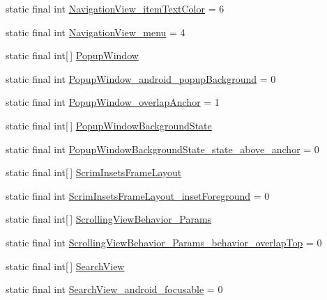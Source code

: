 \begin{DoxyCompactItemize}
\item 
static final int \hyperlink{classcheck_1_1test_1_1_r_1_1styleable_aee02dda2f676d8cbb891a1e27e386d49}{Navigation\+View\+\_\+item\+Text\+Color} = 6
\item 
static final int \hyperlink{classcheck_1_1test_1_1_r_1_1styleable_a96d0c1fc480a50b365523e0530106f73}{Navigation\+View\+\_\+menu} = 4
\item 
static final int\mbox{[}$\,$\mbox{]} \hyperlink{classcheck_1_1test_1_1_r_1_1styleable_a288d8e82cd6f78d38522b3bd6c8acc55}{Popup\+Window}
\item 
static final int \hyperlink{classcheck_1_1test_1_1_r_1_1styleable_ad1f620b82190cd4dec8ccbeb3d2904c7}{Popup\+Window\+\_\+android\+\_\+popup\+Background} = 0
\item 
static final int \hyperlink{classcheck_1_1test_1_1_r_1_1styleable_aeff228e6915165337ceeae75105f3722}{Popup\+Window\+\_\+overlap\+Anchor} = 1
\item 
static final int\mbox{[}$\,$\mbox{]} \hyperlink{classcheck_1_1test_1_1_r_1_1styleable_a63af2b96a7d723f1c8f7cc45982e2b8a}{Popup\+Window\+Background\+State}
\item 
static final int \hyperlink{classcheck_1_1test_1_1_r_1_1styleable_a6cd9e13bf18ca382ac3cfc4c03f36520}{Popup\+Window\+Background\+State\+\_\+state\+\_\+above\+\_\+anchor} = 0
\item 
static final int\mbox{[}$\,$\mbox{]} \hyperlink{classcheck_1_1test_1_1_r_1_1styleable_a864e4953b765cf2c4b15edebf1565653}{Scrim\+Insets\+Frame\+Layout}
\item 
static final int \hyperlink{classcheck_1_1test_1_1_r_1_1styleable_a077f41ccea85d0536aa50008070c632e}{Scrim\+Insets\+Frame\+Layout\+\_\+inset\+Foreground} = 0
\item 
static final int\mbox{[}$\,$\mbox{]} \hyperlink{classcheck_1_1test_1_1_r_1_1styleable_a9b4214227a61058f0ea9bce020f30cad}{Scrolling\+View\+Behavior\+\_\+\+Params}
\item 
static final int \hyperlink{classcheck_1_1test_1_1_r_1_1styleable_a2b80a0f1eea41a224fac01a36d3063ab}{Scrolling\+View\+Behavior\+\_\+\+Params\+\_\+behavior\+\_\+overlap\+Top} = 0
\item 
static final int\mbox{[}$\,$\mbox{]} \hyperlink{classcheck_1_1test_1_1_r_1_1styleable_af133609668e9a4263b21387e9a7574f8}{Search\+View}
\item 
static final int \hyperlink{classcheck_1_1test_1_1_r_1_1styleable_a689e5c0ac8c31670b6e71cfaba9e2c0b}{Search\+View\+\_\+android\+\_\+focusable} = 0
\item 

\end{DoxyCompactItemize}
